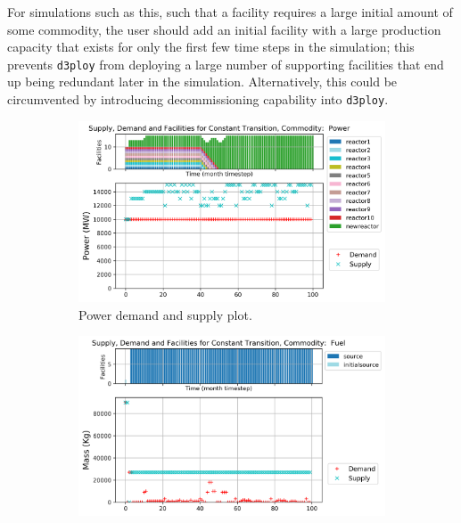 \documentclass[11pt,letterpaper]{article}
\newcommand{\deploy}{\texttt{d3ploy}\xspace}%
\begin{document}
For simulations such as this, such that a facility requires a large initial amount of some
commodity, the user should add an initial
facility with a large production capacity that exists for only the first few time steps
in the simulation; this prevents \deploy from deploying a large number
of supporting facilities that end up being redundant later in
the simulation.
Alternatively, this could be circumvented by introducing decommissioning 
capability into \deploy.  

\begin{figure}[!htbp]
    \centering
    \begin{subfigure}[t]{\textwidth}
    \centering
        \includegraphics[width=\linewidth]{figures/constanttransition-power.png} 
        \caption{Power demand and supply plot.}
        \label{fig:constanttransition-power}
    \end{subfigure}
    \vspace{1cm}
    \begin{subfigure}[t]{0.45\textwidth}
        \centering
        \includegraphics[width=\linewidth]{figures/constanttransition-fuel.png} 

\end{subfigure}
\end{figure}
\end{document}

